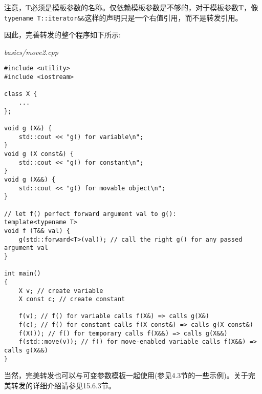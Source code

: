 注意，T必须是模板参数的名称。仅依赖模板参数是不够的，对于模板参数T，像\texttt{typename T::iterator\&\&}这样的声明只是一个右值引用，而不是转发引用。

因此，完善转发的整个程序如下所示:

\noindent
\textit{basics/move2.cpp}
\begin{lstlisting}[style=styleCXX]
#include <utility>
#include <iostream>

class X {
	...
};

void g (X&) {
	std::cout << "g() for variable\n";
}
void g (X const&) {
	std::cout << "g() for constant\n";
}
void g (X&&) {
	std::cout << "g() for movable object\n";
}

// let f() perfect forward argument val to g():
template<typename T>
void f (T&& val) {
	g(std::forward<T>(val)); // call the right g() for any passed argument val
}

int main()
{
	X v; // create variable
	X const c; // create constant
	
	f(v); // f() for variable calls f(X&) => calls g(X&)
	f(c); // f() for constant calls f(X const&) => calls g(X const&)
	f(X()); // f() for temporary calls f(X&&) => calls g(X&&)
	f(std::move(v)); // f() for move-enabled variable calls f(X&&) => calls g(X&&)
}
\end{lstlisting}

当然，完美转发也可以与可变参数模板一起使用(参见4.3节的一些示例)。关于完美转发的详细介绍请参见15.6.3节。






